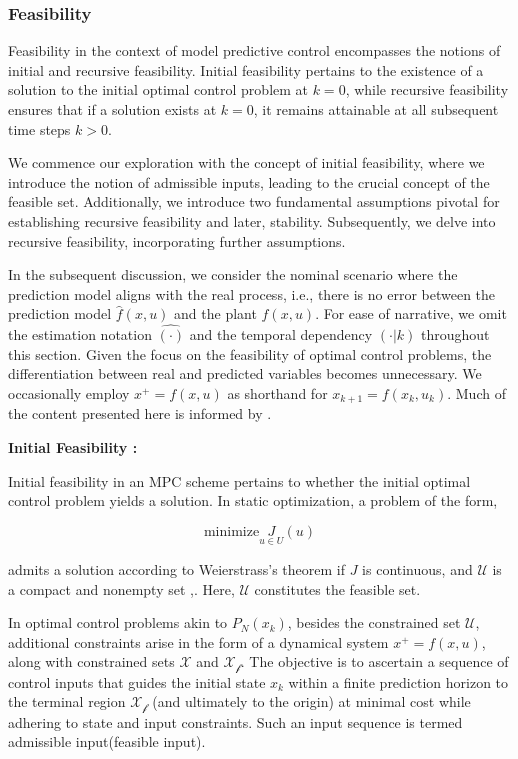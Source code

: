 \subsubsection{Feasibility}
Feasibility in the context of model predictive control  encompasses the notions of initial and recursive feasibility. Initial feasibility pertains to the existence of a solution to the initial optimal control problem at $k = 0$, while recursive feasibility ensures that if a solution exists at $k = 0$, it remains attainable at all subsequent time steps $k > 0$.

We commence our exploration with the concept of initial feasibility, where we introduce the notion of admissible inputs, leading to the crucial concept of the feasible set. Additionally, we introduce two fundamental assumptions pivotal for establishing recursive feasibility and later, stability. Subsequently, we delve into recursive feasibility, incorporating further assumptions.

In the subsequent discussion, we consider the nominal scenario where the prediction model aligns with the real process, i.e., there is no error between the prediction model $\hat{f}(x,u)$ and the plant $f(x,u)$. For ease of narrative, we omit the estimation notation $\hat{(\cdot)}$ and the temporal dependency $(\cdot|k)$ throughout this section. Given the focus on the feasibility of optimal control problems, the differentiation between real and predicted variables becomes unnecessary. We occasionally employ $x^+ = f(x,u)$ as shorthand for $x_{k+1} = f(x_k,u_k)$. Much of the content presented here is informed by \cite{limon2006stability,limon2009input,rawlings2009model}.

\textbf{Initial Feasibility :}

Initial feasibility in an MPC scheme pertains to whether the initial optimal control problem yields a solution. In static optimization, a problem of the form,

\[
\text{minimize}\underset{u\in U} J(u)
\]

admits a solution according to Weierstrass's theorem if $J$ is continuous, and $\mathcal{U}$ is a compact and nonempty set \cite{rawlings2009model},\cite{luenberger1969optimization}. Here, $\mathcal{U}$ constitutes the feasible set.

In optimal control problems akin to $P_N(x_k)$, besides the constrained set $\mathcal{U}$, additional constraints arise in the form of a dynamical system $x^+ = f(x,u)$, along with constrained sets $\mathcal{X}$ and $\mathcal{X_f}$. The objective is to ascertain a sequence of control inputs that guides the initial state $x_k$ within a finite prediction horizon to the terminal region $\mathcal{X_f}$ (and ultimately to the origin) at minimal cost while adhering to state and input constraints. Such an input sequence is termed admissible input(feasible input).

